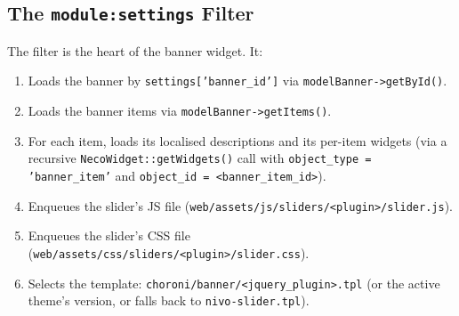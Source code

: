 \documentclass[11pt,a4paper]{article}
\begin{document}
\subsection{The \texttt{module:settings} Filter}

The filter is the heart of the banner widget. It:

\begin{enumerate}[leftmargin=1.6em,itemsep=2pt]
  \item Loads the banner by \texttt{settings['banner\_id']} via
        \texttt{modelBanner->getById()}.
  \item Loads the banner items via
        \texttt{modelBanner->getItems()}.
  \item For each item, loads its localised descriptions and its
        per-item widgets (via a recursive
        \texttt{NecoWidget::getWidgets()} call with
        \texttt{object\_type = 'banner\_item'} and
        \texttt{object\_id = <banner\_item\_id>}).
  \item Enqueues the slider's JS file
        (\texttt{web/assets/js/sliders/<plugin>/slider.js}).
  \item Enqueues the slider's CSS file
        (\texttt{web/assets/css/sliders/<plugin>/slider.css}).
  \item Selects the template:
        \texttt{choroni/banner/<jquery\_plugin>.tpl}
        (or the active theme's version, or falls back to
        \texttt{nivo-slider.tpl}).
\end{enumerate}
\end{document}
